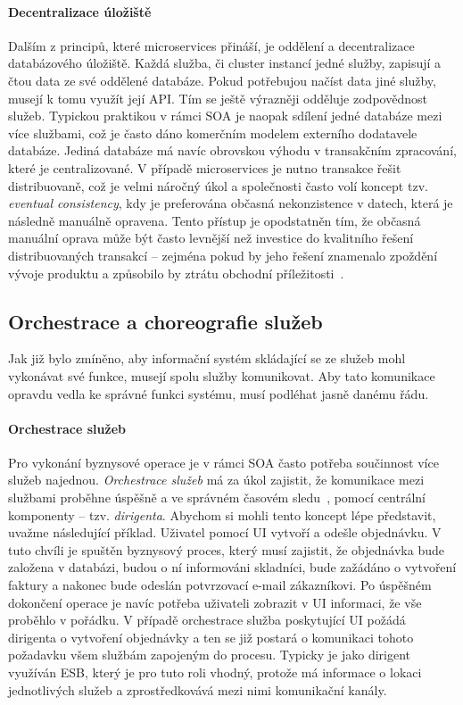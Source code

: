 \paragraph{Decentralizace úložiště}
Dalším z principů, které microservices přináší, je oddělení a decentralizace
databázového úložiště. Každá služba, či cluster instancí jedné služby, zapisují
a čtou data ze své oddělené databáze. Pokud potřebujou načíst data jiné služby,
musejí k tomu využít její API. Tím se ještě výrazněji odděluje zodpovědnost služeb.
Typickou praktikou v rámci SOA je naopak sdílení jedné databáze mezi více službami,
což je často dáno komerčním modelem externího dodatavele databáze. Jediná databáze
má navíc obrovskou výhodu v transakčním zpracování, které je centralizované.
V případě microservices je nutno transakce řešit distribuovaně, což je velmi náročný
úkol a společnosti často volí koncept tzv. \textit{eventual consistency}, kdy je
preferována občasná nekonzistence v datech, která je následně manuálně opravena.
Tento přístup je opodstatněn tím, že občasná manuální oprava může být
často levnější než investice do kvalitního řešení distribuovaných transakcí –
zejména pokud by jeho řešení znamenalo zpoždění vývoje produktu a způsobilo
by ztrátu obchodní příležitosti~\cite{lewis2014microservices}.

\subsection{Orchestrace a choreografie služeb}

Jak již bylo zmíněno, aby informační systém skládající se ze služeb mohl vykonávat
své funkce, musejí spolu služby komunikovat. Aby tato komunikace opravdu vedla
ke správné funkci systému, musí podléhat jasně danému řádu.

\paragraph{Orchestrace služeb}
Pro vykonání byznysové operace je v rámci SOA často potřeba součinnost více služeb
najednou. \textit{Orchestrace služeb} má za úkol zajistit, že komunikace mezi službami
proběhne úspěšně a ve správném časovém sledu~\cite{orchestration},
pomocí centrální komponenty – tzv. \textit{dirigenta}.
Abychom si mohli tento koncept lépe představit, uvažme následující příklad. Uživatel
pomocí UI vytvoří a odešle objednávku. V tuto chvíli
je spuštěn byznysový proces, který musí zajistit, že objednávka bude založena v databázi,
budou o ní informováni skladníci, bude zažádáno o vytvoření faktury a nakonec bude odeslán
potvrzovací e-mail zákazníkovi. Po úspěšném dokončení operace je navíc potřeba uživateli
zobrazit v UI informaci, že vše proběhlo v pořádku. V případě orchestrace služba
poskytující UI požádá dirigenta o vytvoření objednávky a ten se již postará o
komunikaci tohoto požadavku všem službám zapojeným do procesu.
Typicky je jako dirigent využíván ESB, který je pro tuto roli vhodný,
protože má informace o lokaci jednotlivých služeb a zprostředkovává mezi nimi
komunikační kanály.

